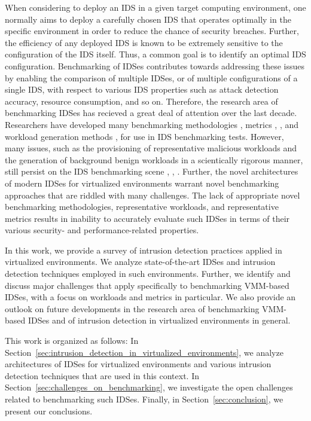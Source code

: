 When considering to deploy an IDS in a given target computing environment, one normally aims to deploy a carefully chosen IDS that operates optimally in the specific environment in order to reduce the chance of security breaches. Further, the efficiency of any deployed IDS is known to be extremely sensitive to the configuration of the IDS itself. Thus, a common goal is to identify an optimal IDS configuration. Benchmarking of IDSes contributes towards addressing these issues by enabling the comparison of multiple IDSes, or of multiple configurations of a single IDS, with respect to various IDS properties such as attack detection accuracy, resource consumption, and so on. Therefore, the research area of benchmarking IDSes has recieved a great deal of attention over the last decade. Researchers have developed many benchmarking methodologies \cite{hall:capacity}, metrics \cite{gu:measuring}, \cite{gaffney:evaluation}, and workload generation methods \cite{fonesca:vulnerability}, \cite{sommers:aframework} for use in IDS benchmarking tests.  However, many issues, such as the provisioning of representative malicious workloads and the generation of background benign workloads in a scientically rigorous manner, still persist on the IDS benchmarking scene \cite{mell:anoverview}, \cite{zanero:my}, \cite{stuckman:tracking}. Further, the novel architectures of modern IDSes for virtualized environments warrant novel benchmarking approaches that are riddled with many challenges. The lack of appropriate novel benchmarking methodologies, representative workloads, and representative metrics results in inability to accurately evaluate such IDSes in terms of their various security- and performance-related properties. 

In this work, we provide a survey of intrusion detection practices applied in virtualized environments. We analyze state-of-the-art IDSes and intrusion detection techniques employed in such environments. Further, we identify and discuss major challenges that apply specifically to benchmarking VMM-based IDSes, with a focus on workloads and metrics in particular. We also provide an outlook on future developments in the research area of benchmarking VMM-based IDSes and of intrusion detection in virtualized environments in general. 

This work is organized as follows: In Section~\ref{sec:intrusion_detection_in_virtualized_environments}, we analyze architectures of IDSes for virtualized environments and various intrusion detection techniques that are used in this context. In Section~\ref{sec:challenges_on_benchmarking}, we investigate the open challenges related to benchmarking such IDSes. Finally, in Section~\ref{sec:conclusion}, we present our conclusions. 



